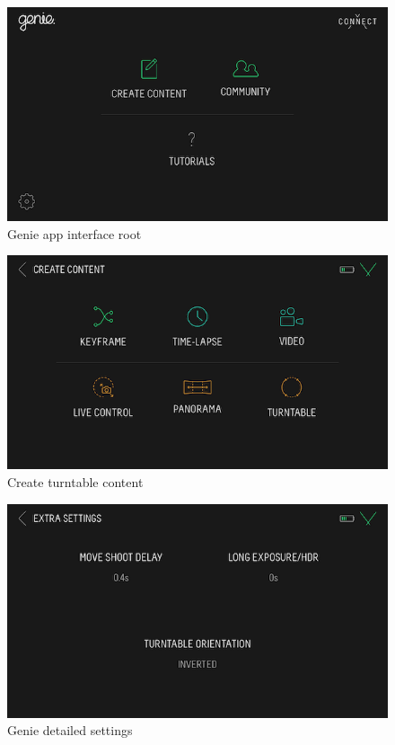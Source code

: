 \documentclass[
]{book}
\theoremstyle{definition}
\theoremstyle{definition}
\theoremstyle{definition}
\theoremstyle{definition}
\theoremstyle{remark}
\begin{document}
\begin{figure}
\hypertarget{genie_root}{%
\centering
\includegraphics{Figures/genie_root.PNG}
\caption{Genie app interface root}\label{genie_root}
}
\end{figure}

\begin{figure}
\hypertarget{genie_content}{%
\centering
\includegraphics{Figures/genie_create.PNG}
\caption{Create turntable content}\label{genie_content}
}
\end{figure}

\hfill\break

\begin{figure}
\hypertarget{fig:genie_settings}{%
\centering
\includegraphics{Figures/genie_settings.PNG}
\caption{Genie detailed
settings}\label{fig:genie_settings}
}
\end{figure}
\end{document}

